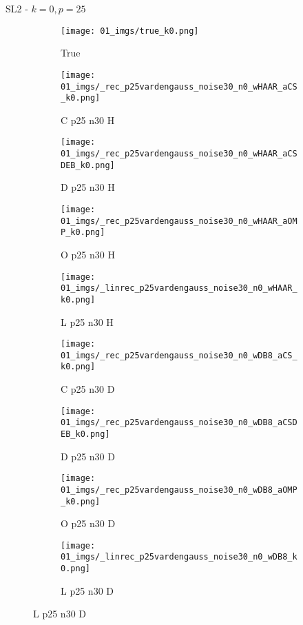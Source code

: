 \begin{frame}{SL2 - $k=0,p=25$}{}
\begin{figure}
\begin{subfigure}{0.1\textwidth}
\texttt{[image: 01\_imgs/true\_k0.png]}
\caption*{\Tiny True}
\end{subfigure}
\begin{subfigure}{0.1\textwidth}
\texttt{[image: 01\_imgs/\_rec\_p25vardengauss\_noise30\_n0\_wHAAR\_aCS\_k0.png]}
\caption*{\Tiny C p25 n30 H}
\end{subfigure}
\begin{subfigure}{0.1\textwidth}
\texttt{[image: 01\_imgs/\_rec\_p25vardengauss\_noise30\_n0\_wHAAR\_aCSDEB\_k0.png]}
\caption*{\Tiny D p25 n30 H}
\end{subfigure}
\begin{subfigure}{0.1\textwidth}
\texttt{[image: 01\_imgs/\_rec\_p25vardengauss\_noise30\_n0\_wHAAR\_aOMP\_k0.png]}
\caption*{\Tiny O p25 n30 H}
\end{subfigure}
\begin{subfigure}{0.1\textwidth}
\texttt{[image: 01\_imgs/\_linrec\_p25vardengauss\_noise30\_n0\_wHAAR\_k0.png]}
\caption*{\Tiny L p25 n30 H}
\end{subfigure}
\begin{subfigure}{0.1\textwidth}
\texttt{[image: 01\_imgs/\_rec\_p25vardengauss\_noise30\_n0\_wDB8\_aCS\_k0.png]}
\caption*{\Tiny C p25 n30 D}
\end{subfigure}
\begin{subfigure}{0.1\textwidth}
\texttt{[image: 01\_imgs/\_rec\_p25vardengauss\_noise30\_n0\_wDB8\_aCSDEB\_k0.png]}
\caption*{\Tiny D p25 n30 D}
\end{subfigure}
\begin{subfigure}{0.1\textwidth}
\texttt{[image: 01\_imgs/\_rec\_p25vardengauss\_noise30\_n0\_wDB8\_aOMP\_k0.png]}
\caption*{\Tiny O p25 n30 D}
\end{subfigure}
\begin{subfigure}{0.1\textwidth}
\texttt{[image: 01\_imgs/\_linrec\_p25vardengauss\_noise30\_n0\_wDB8\_k0.png]}
\caption*{\Tiny L p25 n30 D}
\end{subfigure}
\end{figure}
\end{frame}

